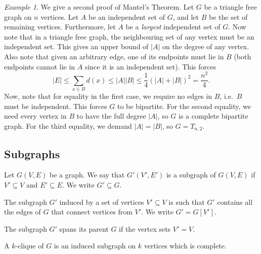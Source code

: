 \documentclass[11pt]{article}
\theoremstyle{definition}
\theoremstyle{remark}
\newtheorem*{example}{Example}
\numberwithin{equation}{section}
\begin{document}
    \begin{example}
        We give a second proof of Mantel's Theorem. Let $G$ be a triangle free graph
        on $n$ vertices. Let $A$ be an independent set of $G$, and let $B$ be the set
        of remaining vertices. Furthermore, let $A$ be a \emph{largest} independent
        set of $G$. Now note that in a triangle free graph, the neighbouring set of
        any vertex must be an independent set. This gives an upper bound of $|A|$ on
        the degree of any vertex. Also note that given an arbitrary edge, one of its
        endpoints must lie in $B$ (both endpoints cannot lie in $A$ since it is an
        independent set). This forces \[
            |E| \leq \sum_{x \in B} d(x) \leq |A| |B| \leq \frac{1}{4}(|A| + |B|)^2 =
            \frac{n^2}{4}.
        \] 
        Now, note that for equality in the first case, we require no edges in $B$,
        i.e.\ $B$ must be independent. This forces $G$ to be bipartite. For the
        second equality, we need every vertex in $B$ to have the full degree $|A|$,
        so $G$ is a complete bipartite graph. For the third equality, we demand $|A|
        = |B|$, so $G = T_{n, 2}$.
    \end{example}

    \subsection{Subgraphs}
    \begin{definition}
        Let $G(V, E)$ be a graph. We say that $G'(V', E')$ is a subgraph of $G(V, E)$
        if $V' \subseteq V$ and $E' \subseteq E$. We write $G' \subseteq G$.
    \end{definition}

    \begin{definition}
        The subgraph $G'$ induced by a set of vertices $V' \subseteq V$ is such that
        $G'$ contains all the edges of $G$ that connect vertices from $V'$. We write
        $G' = G[V']$.
    \end{definition}

    \begin{definition}
        The subgraph $G'$ spans its parent $G$ if the vertex sets $V' = V$.
    \end{definition}

    \begin{definition}
        A $k$-clique of $G$ is an induced subgraph on $k$ vertices which is complete.
    \end{definition}
\end{document}
